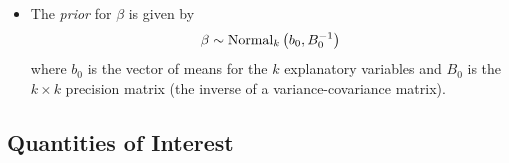 \documentclass[letterpaper,10pt,english]{sphinxmanual}
\begin{document}
\begin{itemize}
\item {} 
The \emph{prior} for \(\beta\) is given by
\begin{gather}
\begin{split}\begin{aligned}
\beta \sim \textrm{Normal}_k\left(  b_{0},B_{0}^{-1}\right)\end{aligned}\end{split}\notag
\end{gather}
where \(b_{0}\) is the vector of means for the \(k\)
explanatory variables and \(B_{0}\) is the \(k \times k\)
precision matrix (the inverse of a variance-covariance matrix).

\end{itemize}


\subsection{Quantities of Interest}
\end{document}
